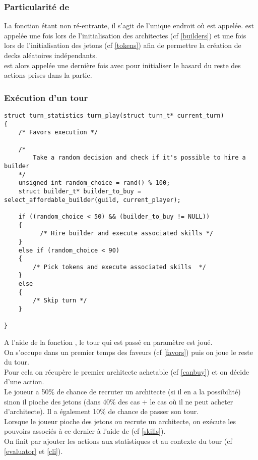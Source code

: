\subsubsection*{Particularité de }
La fonction  étant non ré-entrante, il s'agit de l'unique endroit où  est appelée.  est appelée une fois lors de l'initialisation des architectes (cf \ref{builders}) et une fois lors de l'initialisation des jetons (cf \ref{tokens}) afin de permettre la création de decks aléatoires indépendants. \\
 est alors appelée une dernière fois avec  pour initialiser le hasard du reste des actions prises dans la partie.

\subsubsection{Exécution d'un tour}

\begin{lstlisting}[frame=single, caption={Implémentation de l'exécution d'un tour}]
struct turn_statistics turn_play(struct turn_t* current_turn)
{
    /* Favors execution */
    
	/*
        Take a random decision and check if it's possible to hire a builder
	*/
	unsigned int random_choice = rand() % 100; 
	struct builder_t* builder_to_buy = select_affordable_builder(guild, current_player);

	if ((random_choice < 50) && (builder_to_buy != NULL)) 
	{
		  /* Hire builder and execute associated skills */ 
	}
	else if (random_choice < 90)
	{
		/* Pick tokens and execute associated skills  */
	}
	else 
	{
		/* Skip turn */
	}

}
\end{lstlisting}
A l'aide de la fonction , le tour qui est passé en paramètre est joué.\\
On s'occupe dans un premier temps des faveurs (cf \ref{favors}) puis on joue le reste du tour.\\
Pour cela on récupère le premier architecte achetable (cf \ref{canbuy}) et on décide d'une action. \\Le joueur a 50$\%$ de chance de recruter un architecte (si il en a la possibilité) sinon il pioche des jetons (dans 40$\%$ des cas + le cas où il ne peut acheter d'architecte). Il a également 10$\%$ de chance de passer son tour. \\
Lorsque le joueur pioche des jetons ou recrute un architecte, on exécute les pouvoirs associés à ce dernier à l'aide de  (cf \ref{skills}).\\
On finit par ajouter les actions aux statistiques et au contexte du tour (cf \ref{evaluator} et \ref{cli}).


